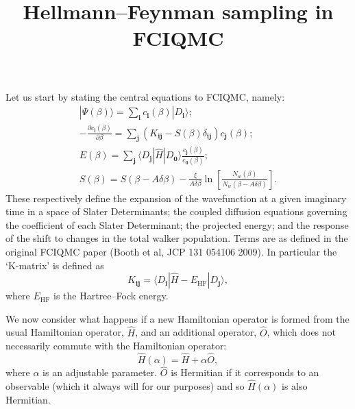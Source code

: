 \documentclass[a4paper, 11pt]{revtex4}
\newcommand{\bi}{\mathbf{i}}
\newcommand{\bj}{\mathbf{j}}
\newcommand{\bz}{\mathbf{0}}
\newcommand{\dd}[2]{\frac{\partial#1}{\partial#2}}
\newcommand{\bra}{\langle}
\newcommand{\ket}{\rangle}
\newcommand{\EHF}{E_{\text{HF}}}
\begin{document}
\title{Hellmann--Feynman sampling in FCIQMC}

\maketitle

Let us start by stating the central equations to FCIQMC, namely:
\begin{gather}
|\Psi(\beta)\ket = \sum_\bi c_\bi(\beta) | D_\bi \ket; \\
- \dd{c_\bi(\beta)}{\beta} = \sum_\bj (K_{\bi\bj} - S(\beta) \delta_{\bi\bj}) c_\bj(\beta); \\
E(\beta) = \sum_\bj \bra D_\bj | \hat{H} | D_\bz \ket \frac{c_\bj(\beta)}{c_\bz(\beta)}; \\
S(\beta) = S(\beta - A\delta\beta) - \frac{\xi}{A\delta\beta} \ln{\left[\frac{N_w(\beta)}{N_w(\beta-A\delta\beta)}\right]}.
\end{gather}
These respectively define the expansion of the wavefunction at a given imaginary time in a space of Slater Determinants; the coupled diffusion equations governing the coefficient of each Slater Determinant; the projected energy; and the response of the shift to changes in the total walker population.  Terms are as defined in the original FCIQMC paper (Booth et al, JCP 131 054106 2009).  In particular the `K-matrix' is defined as 
\begin{equation}
K_{\bi\bj} = \bra D_\bi | \hat{H} - \EHF | D_\bj \ket,
\end{equation}
where $\EHF$ is the Hartree--Fock energy.

We now consider what happens if a new Hamiltonian operator is formed from the usual Hamiltonian operator, $\hat{H}$, and an additional operator, $\hat{O}$, which does not necessarily commute with the Hamiltonian operator:
\begin{equation}
\hat{H}(\alpha) = \hat{H} + \alpha \hat{O},
\end{equation}
where $\alpha$ is an adjustable parameter.  $\hat{O}$ is Hermitian if it corresponds to an observable (which it always will for our purposes) and so
$\hat{H}(\alpha)$ is also Hermitian.
\end{document}

